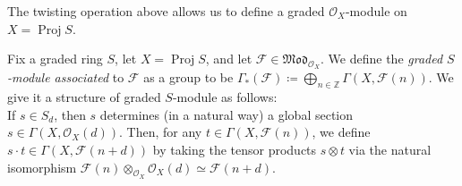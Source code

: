\documentclass[11pt,a4paper,footinclude=true,headinclude=true]{scrbook} %
\DeclareMathOperator{\Proj}{Proj}
\newcommand{\FF}{\mathscr{F}}
\newcommand{\OO}{\mathcal{O}}
\newcommand{\<}{\langle}
\newcommand{\>}{\rangle}
\newcommand{\MOD}{\mathfrak{Mod}}
\newenvironment{definition*}[2][Definition]
    { \begin{mdframed}[backgroundcolor=blue!20] \textbf{#1.}\ }
    {  \end{mdframed}}
\newenvironment{remark*}[2][Remark]
    { \begin{mdframed}[backgroundcolor=gray!20] \textbf{#1.}\ }
    {  \end{mdframed}}
\begin{document}
\begin{remark*}{}
    The twisting operation above allows us to define a graded $\OO_X$-module on $X=\Proj S$.
\end{remark*}

\begin{definition*}{}\mbox{}
    Fix a graded ring $S$, let $X=\Proj S$, and let $\FF\in\MOD_{\OO_X}$. We define the \textit{graded $S$-module associated} to $\FF$ as a group to be $\Gamma_\ast(\FF)\coloneqq\bigoplus_{n\in\mathbb{Z}}\Gamma(X,\FF(n))$. We give it a structure of graded $S$-module as follows:\\ 
    If $s\in S_d$, then $s$ determines (in a natural way) a global section $s\in\Gamma(X,\OO_X(d))$. Then, for any $t\in\Gamma(X,\FF(n))$, we define $s\cdot t\in\Gamma(X,\FF(n+d))$ by taking the tensor products $s\otimes t$ via the natural isomorphism $\FF(n)\otimes_{\OO_X}\OO_X(d)\simeq\FF(n+d)$.
\end{definition*}
\end{document}
